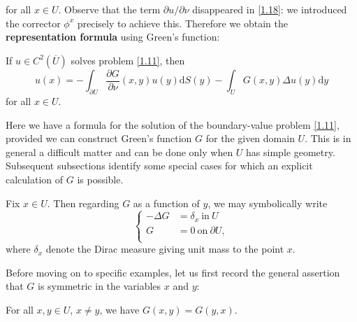 for all $x\in U$. Observe that the term $\partial u/\partial\nu$ disappeared in \eqref{1.18}: we introduced the corrector $\phi^x$ precisely to achieve this. Therefore we obtain the \textbf{representation formula} using Green's function: 
\begin{theorem}
If $u\in C^2(\overline{U})$ solves problem \eqref{1.11}, then 
$$u\left( x \right) =-\int_{\partial U}{\frac{\partial G}{\partial \nu}\left( x,y \right) u\left( y \right) \mathrm{d}S\left( y \right)}-\int_U{G\left( x,y \right) \Delta u\left( y \right) \mathrm{d}y}$$
for all $x\in U$.
\end{theorem}
Here we have a formula for the solution of the boundary-value problem \eqref{1.11}, provided we can construct Green's function $G$ for the given domain $U$. This is in general a difficult matter and can be done only when $U$ has simple geometry. Subsequent subsections identify some special cases for which an explicit calculation of $G$ is possible.\par
Fix $x\in U$. Then regarding $G$ as a function of $y$, we may symbolically write 
$$
\left\{ \begin{aligned}
	-\Delta G&=\delta_x\ \text{in}\ U\\
	G&=0\ \text{on}\ \partial U,\\
\end{aligned} \right. 
$$
where $\delta_x$ denote the Dirac measure giving unit mass to the point $x$.\par
Before moving on to specific examples, let us first record the general assertion that $G$ is symmetric in the variables $x$ and $y$: 
\begin{theorem}
For all $x,y\in U$, $x\ne y$, we have $G(x,y)=G(y,x)$.
\end{theorem}
